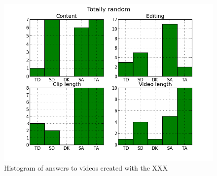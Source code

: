 %
\begin{figure}
     \centering
     \includegraphics[width=1.0\textwidth]{img/totallyrandom_barplot.png}
     \caption{Histogram of answers to videos created with the XXX}\label{fig:hist_random}
\end{figure}
%